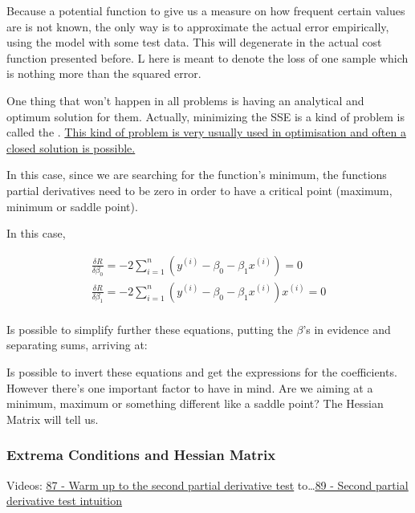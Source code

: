 Because a potential function to give us a measure on how frequent certain values are is not known, the only way is to approximate the actual error empirically, using the model with some test data. This will degenerate in the actual cost function presented before. L here is meant to denote the loss of one sample which is nothing more than the squared error.


One thing that won't happen in all problems is having an analytical and optimum solution for them. Actually, minimizing the SSE is a kind of problem is called the . \ul{This kind of problem is very usually used in optimisation and often a closed solution is possible.}


In this case, since we are searching for the function's minimum, the functions partial derivatives need to be zero in order to have a critical point (maximum, minimum or saddle point).

In this case, 

\begin{align*}
    \frac{\delta R}{\delta \beta_0} = -2 \sum_{i = 1}^n (y^{(i)} - \beta_0 - \beta_1 x^{(i)}) = 0 \\
    \frac{\delta R}{\delta \beta_1} = -2 \sum_{i = 1}^n (y^{(i)} - \beta_0 - \beta_1 x^{(i)})x^{(i)} = 0 \\
\end{align*}

Is possible to simplify further these equations, putting the $\beta$'s in evidence and separating sums, arriving at:


Is possible to invert these equations and get the expressions for the coefficients. However there's one important factor to have in mind. Are we aiming at a minimum, maximum or something different like a saddle point? The Hessian Matrix will tell us.



\subsubsection{Extrema Conditions and Hessian Matrix}

Videos: \href{https://www.youtube.com/watch?v=nRJM4mY-Pq0&list=PLSQl0a2vh4HC5feHa6Rc5c0wbRTx56nF7&index=87}{\ul{87 - Warm up to the second partial derivative test}} to\dots \href{https://www.youtube.com/watch?v=sJo7D74PAak&list=PLSQl0a2vh4HC5feHa6Rc5c0wbRTx56nF7&index=89}{\ul{89 - Second partial derivative test intuition}}


